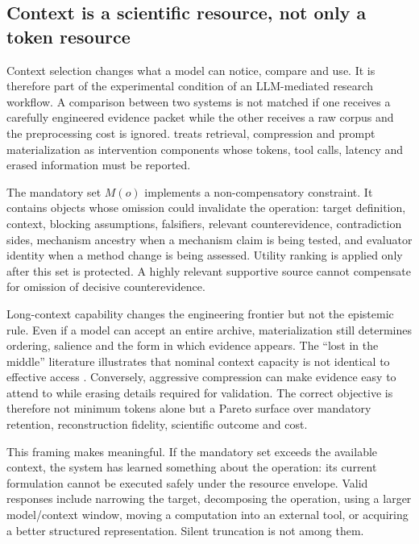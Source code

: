 \subsection{Context is a scientific resource, not only a token resource}

Context selection changes what a model can notice, compare and use. It is therefore part of the experimental condition of an LLM-mediated research workflow. A comparison between two systems is not matched if one receives a carefully engineered evidence packet while the other receives a raw corpus and the preprocessing cost is ignored. \RAKL{} treats retrieval, compression and prompt materialization as intervention components whose tokens, tool calls, latency and erased information must be reported.

The mandatory set \(M(o)\) implements a non-compensatory constraint. It contains objects whose omission could invalidate the operation: target definition, context, blocking assumptions, falsifiers, relevant counterevidence, contradiction sides, mechanism ancestry when a mechanism claim is being tested, and evaluator identity when a method change is being assessed. Utility ranking is applied only after this set is protected. A highly relevant supportive source cannot compensate for omission of decisive counterevidence.

Long-context capability changes the engineering frontier but not the epistemic rule. Even if a model can accept an entire archive, materialization still determines ordering, salience and the form in which evidence appears. The ``lost in the middle'' literature illustrates that nominal context capacity is not identical to effective access \cite{liu2024}. Conversely, aggressive compression can make evidence easy to attend to while erasing details required for validation. The correct objective is therefore not minimum tokens alone but a Pareto surface over mandatory retention, reconstruction fidelity, scientific outcome and cost.

This framing makes \CannotCompile{} meaningful. If the mandatory set exceeds the available context, the system has learned something about the operation: its current formulation cannot be executed safely under the resource envelope. Valid responses include narrowing the target, decomposing the operation, using a larger model/context window, moving a computation into an external tool, or acquiring a better structured representation. Silent truncation is not among them.
